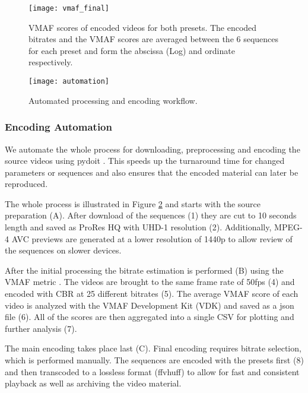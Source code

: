 \begin{figure}[bht!]
	\centering
	\texttt{[image: vmaf\_final]}
	\caption{VMAF scores of encoded videos for both presets. The encoded bitrates and the VMAF scores are averaged between the 6 sequences for each preset and form the abscissa (Log) and ordinate respectively.}
	\label{fig:vmaf:encoded}
\end{figure}

\begin{figure}[bht!]
	\centering
	\texttt{[image: automation]}
	\caption{Automated processing and encoding workflow.}
	\label{fig:automation}
\end{figure}

\subsubsection{Encoding Automation}
We automate the whole process for downloading, preprocessing and encoding the source videos using pydoit \cite{web:pydoit}. This speeds up the turnaround time for changed parameters or sequences and also ensures that the encoded material can later be reproduced.

The whole process is illustrated in Figure \ref{fig:automation} and starts with the source preparation (A). After download of the sequences (1) they are cut to 10 seconds length and saved as ProRes HQ with UHD-1 resolution (2). Additionally, MPEG-4 AVC previews are generated at a lower resolution of 1440p to allow review of the sequences on slower devices.

After the initial processing the bitrate estimation is performed (B) using the VMAF metric \cite{lin2013:mmf}. The videos are brought to the same frame rate of 50fps (4) and encoded with CBR at 25 different bitrates (5). The average VMAF score of each video is analyzed with the VMAF Development Kit (VDK) \cite{web:vdk} and saved as a json file (6). All of the scores are then aggregated into a single CSV for plotting and further analysis (7).

The main encoding takes place last (C). Final encoding requires bitrate selection, which is performed manually. The sequences are encoded with the presets first (8) and then transcoded to a lossless format (ffvhuff) to allow for fast and consistent playback as well as archiving the video material.



